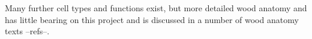 Many further cell types and functions exist, but more detailed wood anatomy and
has little bearing on this project and is discussed in a number of wood anatomy
texts --refs--.